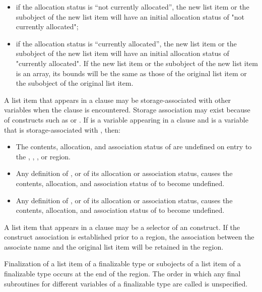\begin{itemize}
\item if the allocation status is ``not currently allocated'', the new list item or the subobject 
of the new list item will have an initial allocation status of "not currently allocated";

\item if the allocation status is ``currently allocated'', the new list item or the subobject of 
the new list item will have an initial allocation status of "currently allocated". If the 
new list item or the subobject of the new list item is an array, its bounds will be the 
same as those of the original list item or the subobject of the original list item.
\end{itemize}

A list item that appears in a  clause may be storage-associated with other 
variables when the  clause is encountered. Storage association may exist 
because of constructs such as  or . If  is a variable appearing 
in a  clause and  is a variable that is storage-associated with , then:

\begin{itemize}
\item The contents, allocation, and association status of  are undefined on entry to the 
, , , or  region.

\item Any definition of , or of its allocation or association status, causes the contents, 
allocation, and association status of  to become undefined. 

\item Any definition of , or of its allocation or association status, causes the contents, 
allocation, and association status of  to become undefined. 
\end{itemize}

A list item that appears in a  clause may be a selector of an  
construct. If the construct association is established prior to a  region, the 
association between the associate name and the original list item will be retained in the 
region.

Finalization of a list item of a finalizable type or subojects of a list item of a finalizable type occurs at the end of the region. The order in which any final subroutines for different variables of a finalizable type are called is unspecified.
\fortranspecificend

